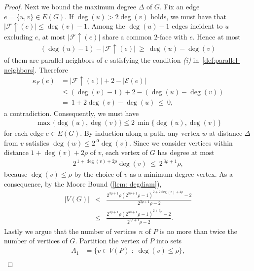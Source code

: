 \documentclass[11pt,a4paper]{amsart}
\newcommand{\forman}[1]{\kappa_F\left({#1}\right)}
\newcommand{\avgdegree}{\rho}
\begin{document}
\begin{proof}
    Next we bound the maximum degree $\Delta$ of $G$. Fix an edge $e=\{u, v\}\in E(G)$. If $\deg(u) >2\deg(v)$ holds, we must have that $|\mathcal{F}\uparrow(e)| \le \deg(v)-1$. Among the $\deg(u) - 1$ edges incident to $u$ excluding $e$, at most $|\mathcal{F}\uparrow(e)|$ share a common $2$-face with $e$. Hence at most
        \begin{align*}
            (\deg(u)-1)-|\mathcal{F}\uparrow(e)|\ \ge\ \deg(u)-\deg(v)
        \end{align*}
    of them are parallel neighbors of $e$ satisfying the condition \emph{(i)} in~\cref{def:parallel-neighbors}. Therefore
        \begin{align*}
            \forman{e} &= |\mathcal{F}\uparrow(e)|+2-|\mathcal{E}(e)| \\
            &\leq(\deg(v)-1)+2-(\deg(u)-\deg(v)) \\
            &=\ 1+2\deg(v)-\deg(u)\ \le\ 0,
        \end{align*}
    a contradiction. Consequently, we must have 
        \begin{align*}
            \max\{\deg(u),\deg(v)\}\le 2\,\min\{\deg(u),\deg(v)\}
        \end{align*}
    for each edge $e\in E(G)$. By induction along a path, any vertex $w$ at distance $\Delta$ from $v$ satisfies $\deg(w)\le 2^\Delta\deg(v)$. Since we consider vertices within distance $1+\deg(v)+2\avgdegree$ of $v$, each vertex of $G$ has degree at most
        \begin{align*}
            2^{\,1+\deg(v)+2\avgdegree}\deg(v)\ \le\ 2^{\,3\avgdegree+1}\avgdegree,
        \end{align*}
    because $\deg(v)\le \avgdegree$ by the choice of $v$ as a minimum-degree vertex. As a consequence, by the Moore Bound (\cref{lem: degdiam}), 
        \begin{eqnarray*}
            |V(G)| &<& \frac{2^{3\avgdegree + 1}\avgdegree( 2^{3\avgdegree + 1}\avgdegree-1)^{2+2\deg(v) +4\avgdegree }-2}{ 2^{3\avgdegree + 1}\avgdegree-2} \\  &\le& \frac{2^{3\avgdegree + 1}\avgdegree( 2^{3\avgdegree + 1}\avgdegree-1)^{2+6\avgdegree }-2}{ 2^{3\avgdegree + 1}\avgdegree-2}. 
        \end{eqnarray*}
    Lastly we argue that the number of vertices $n$ of $P$ is no more than twice the number of vertices of $G$. Partition the vertex of $P$ into sets
        \begin{align*}
            A_1 &= \{v\in V(P) \;:\; \deg(v) \leq \avgdegree\},\\

\end{align*}
\end{proof}
\end{document}
